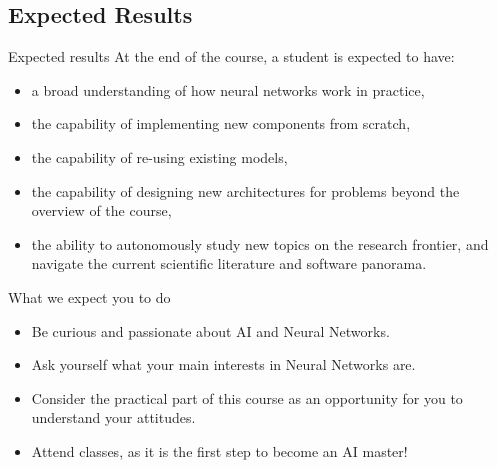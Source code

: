 \documentclass[xcolor=x11names,compress,10pt,unknownkeysallowed,aspectratio=169]{beamer}
\begin{document}
\subsection{Expected Results}
\begin{frame}{Expected results}
At the end of the course, a student is expected to have:

\vspace{0.2cm}
\begin{itemize}\justifying
	\item a broad understanding of \alert{how neural networks work} in practice, 
	
	\vspace{0.2cm}
	\item the capability of \alert{implementing new components} from scratch, 
	
	\vspace{0.2cm}
	\item the capability of \alert{re-using existing models}, 
	
	\vspace{0.2cm}
	\item the capability of \alert{designing new architectures} for problems beyond the overview of the course,
	
	\vspace{0.2cm}
	\item the ability to \alert{autonomously study new topics} on the research frontier, and navigate the current scientific literature and software panorama.
\end{itemize}
\end{frame}
%
\begin{frame}{What we expect you to do}
\begin{itemize}\justifying
    \item Be \alert{curious} and \alert{passionate} about AI and Neural Networks.

    \vspace{0.7cm}
	\item Ask yourself what your main \alert{interests in Neural Networks} are.

	\vspace{0.7cm}
	\item Consider the practical part of this course as an opportunity for you to \alert{understand your attitudes}.
		
	\vspace{0.7cm}
	\item \alert{Attend classes}, as it is the first step to become an \alert{AI master}!
\end{itemize}
\end{frame}
\end{document}
